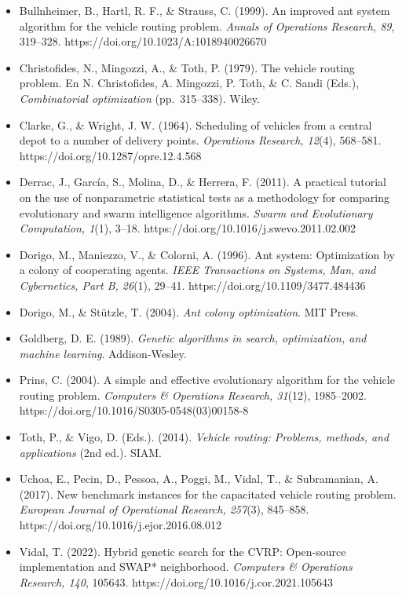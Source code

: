 \documentclass[11pt,letterpaper]{article}
\providecommand{\tightlist}{\setlength{\itemsep}{0pt}\setlength{\parskip}{0pt}}
\begin{document}
\begin{itemize}[label={},leftmargin=1.5em,itemindent=-1.5em]
\tightlist
\item
  Bullnheimer, B., Hartl, R. F., \& Strauss, C. (1999). An improved ant system algorithm for the vehicle routing problem. \emph{Annals of Operations Research, 89}, 319--328. https://doi.org/10.1023/A:1018940026670
\item
  Christofides, N., Mingozzi, A., \& Toth, P. (1979). The vehicle routing problem. En N. Christofides, A. Mingozzi, P. Toth, \& C. Sandi (Eds.), \emph{Combinatorial optimization} (pp.~315--338). Wiley.
\item
  Clarke, G., \& Wright, J. W. (1964). Scheduling of vehicles from a central depot to a number of delivery points. \emph{Operations Research, 12}(4), 568--581. https://doi.org/10.1287/opre.12.4.568
\item
  Derrac, J., García, S., Molina, D., \& Herrera, F. (2011). A practical tutorial on the use of nonparametric statistical tests as a methodology for comparing evolutionary and swarm intelligence algorithms. \emph{Swarm and Evolutionary Computation, 1}(1), 3--18. https://doi.org/10.1016/j.swevo.2011.02.002
\item
  Dorigo, M., Maniezzo, V., \& Colorni, A. (1996). Ant system: Optimization by a colony of cooperating agents. \emph{IEEE Transactions on Systems, Man, and Cybernetics, Part B, 26}(1), 29--41. https://doi.org/10.1109/3477.484436
\item
  Dorigo, M., \& Stützle, T. (2004). \emph{Ant colony optimization}. MIT Press.
\item
  Goldberg, D. E. (1989). \emph{Genetic algorithms in search, optimization, and machine learning}. Addison-Wesley.
\item
  Prins, C. (2004). A simple and effective evolutionary algorithm for the vehicle routing problem. \emph{Computers \& Operations Research, 31}(12), 1985--2002. https://doi.org/10.1016/S0305-0548(03)00158-8
\item
  Toth, P., \& Vigo, D. (Eds.). (2014). \emph{Vehicle routing: Problems, methods, and applications} (2nd ed.). SIAM.
\item
  Uchoa, E., Pecin, D., Pessoa, A., Poggi, M., Vidal, T., \& Subramanian, A. (2017). New benchmark instances for the capacitated vehicle routing problem. \emph{European Journal of Operational Research, 257}(3), 845--858. https://doi.org/10.1016/j.ejor.2016.08.012
\item
  Vidal, T. (2022). Hybrid genetic search for the CVRP: Open-source implementation and SWAP* neighborhood. \emph{Computers \& Operations Research, 140}, 105643. https://doi.org/10.1016/j.cor.2021.105643
\end{itemize}
\end{document}
